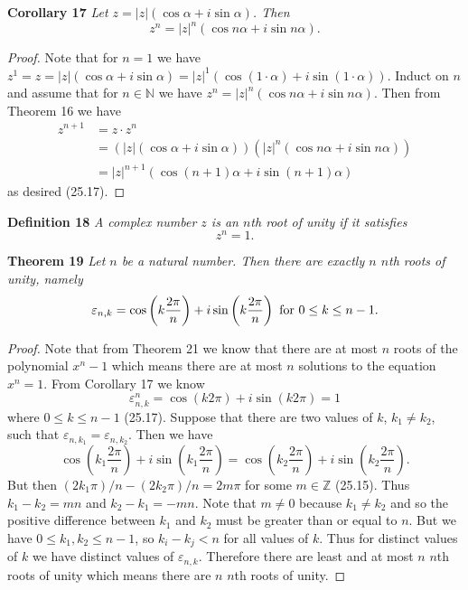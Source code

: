 \documentclass{article}
\begin{document}
\begin{flushleft}
\textbf{Corollary 17}
\textsl{Let $z = |z| (\cos \alpha + i \sin \alpha)$. Then
\[
z^n = |z|^n (\cos n \alpha + i \sin n \alpha).
\]}
\begin{proof}
Note that for $n=1$ we have $z^1 = z = |z| (\cos \alpha + i \sin \alpha) = |z|^1 (\cos (1 \cdot \alpha) + i \sin (1 \cdot \alpha))$. Induct on $n$ and assume that for $n \in \mathbb{N}$ we have $z^n = |z|^n (\cos n \alpha + i \sin n \alpha)$. Then from Theorem 16 we have
\begin{align*}
z^{n+1} &= z \cdot z^n \\
	   &= (|z| (\cos \alpha + i \sin \alpha)) (|z|^n (\cos n \alpha + i \sin n \alpha)) \\
	   &= |z|^{n+1} (\cos (n+1) \alpha + i \sin (n+1) \alpha)
\end{align*}
as desired (25.17).
\end{proof}

\textbf{Definition 18}
\textsl{A complex number $z$ is an $n$th root of unity if it satisfies
\[
z^n = 1.
\]}\newline

\textbf{Theorem 19}
\textsl{Let $n$ be a natural number. Then there are exactly $n$ $n$th roots of unity, namely
\[
\varepsilon_{n,k} = \cos \left ( k \frac{2 \pi}{n} \right ) + i \sin \left ( k \frac{2 \pi}{n} \right ) \textup{ for } 0 \leq k \leq n-1.
\]}
\begin{proof}
Note that from Theorem 21 we know that there are at most $n$ roots of the polynomial $x^n - 1$ which means there are at most $n$ solutions to the equation $x^n = 1$. From Corollary 17 we know
\[
\varepsilon_{n,k}^n = \cos \left ( k 2 \pi \right ) + i \sin \left ( k 2 \pi \right ) = 1
\]
where $0 \leq k \leq n-1$ (25.17). Suppose that there are two values of $k$, $k_1 \neq k_2$, such that $\varepsilon_{n,k_1} = \varepsilon_{n,k_2}$. Then we have
\[
\cos \left ( k_1 \frac{2 \pi}{n} \right ) + i \sin \left ( k_1 \frac{2 \pi}{n} \right ) = \cos \left ( k_2 \frac{2 \pi}{n} \right ) + i \sin \left ( k_2 \frac{2 \pi}{n} \right ).
\]
But then $(2 k_1 \pi)/n - (2 k_2 \pi)/n = 2 m \pi$ for some $m \in \mathbb{Z}$ (25.15). Thus $k_1 - k_2 = mn$ and $k_2 - k_1 = -mn$. Note that $m \neq 0$ because $k_1 \neq k_2$ and so the positive difference between $k_1$ and $k_2$ must be greater than or equal to $n$. But we have $0 \leq k_1, k_2 \leq n-1$, so $k_i - k_j < n$ for all values of $k$. Thus for distinct values of $k$ we have distinct values of $\varepsilon_{n,k}$. Therefore there are least and at most $n$ $n$th roots of unity which means there are $n$ $n$th roots of unity.
\end{proof}


\end{flushleft}
\end{document}

